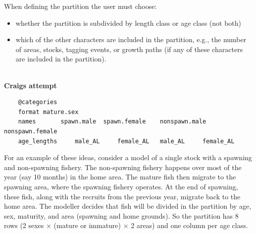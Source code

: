 When defining the partition the user must choose:
\begin{itemize}
\item	whether the partition is subdivided by length class or age class (not both)
\item	which of the other characters are included in the partition, e.g., the number of areas, stocks, tagging events, or growth paths (if any of these characters are included in the partition).
\end{itemize}
\\ 
\textbf{Craigs attempt}\\
{\small{\begin{verbatim}
	@categories 
	format mature.sex
	names 		spawn.male 	spawn.female 	nonspawn.male 	nonspawn.female
	age_lengths 	male_AL		female_AL   male_AL		female_AL  
		\end{verbatim}}}	

For an example of these ideas, consider a model of a single stock with a spawning and non-spawning fishery. The non-spawning fishery happens over most of the year (say 10 months) in the home area. The mature fish then migrate to the spawning area, where the spawning fishery operates. At the end of spawning, these fish, along with the recruits from the previous year, migrate back to the home area. The modeller decides that fish will be divided in the partition by age, sex, maturity, and area (spawning and home grounds). So the partition has 8 rows (2 sexes × (mature or immature) × 2 areas) and one column per age class. 


